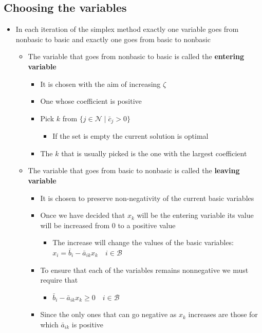 \documentclass[11pt]{article}
\begin{document}
\subsection{Choosing the variables}
\label{sec:orgfc8dd7e}
\begin{itemize}
\item In each iteration of the simplex method exactly one variable goes from nonbasic to basic and exactly one goes from basic to nonbasic
\begin{itemize}
\item The variable that goes from nonbasic to basic is called the \textbf{entering variable}
\begin{itemize}
\item It is chosen with the aim of increasing \(\zeta\)
\item One whose coefficient is positive
\item Pick \(k\) from \(\{j \in \mathcal N \mid \bar c_j > 0 \}\)
\begin{itemize}
\item If the set is empty the current solution is optimal
\end{itemize}
\item The \(k\) that is usually picked is the one with the largest coefficient
\end{itemize}
\item The variable that goes from basic to nonbasic is called the \textbf{leaving variable}
\begin{itemize}
\item It is chosen to preserve non-negativity of the current basic variables
\item Once we have decided that \(x_k\) will be the entering variable its value will be increased from 0 to a positive value
\begin{itemize}
\item The increase will change the values of the basic variables: \(x_i = \bar b_i - \bar a_{ik}x_k \quad i \in \mathcal B\)
\end{itemize}
\item To ensure that each of the variables remains nonnegative we must require that
\begin{itemize}
\item \(\bar b_i - \bar a_{ik} x_k \geq 0 \quad i \in \mathcal B\)
\end{itemize}
\item Since the only ones that can go negative as \(x_k\) increases are those for which \(\bar a_{ik}\) is positive

\end{itemize}
\end{itemize}
\end{itemize}
\end{document}
